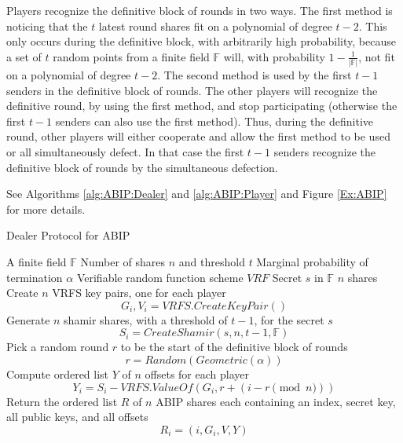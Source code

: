 \documentclass{dalcsthesis}
\begin{document}
Players recognize the definitive block of rounds in two ways. The first method is noticing that the $t$ latest round shares fit on a polynomial of degree $t-2$. This only occurs during the definitive block, with arbitrarily high probability, because a set of $t$ random points from a finite field $\mathbb{F}$ will, with probability $1 - \frac{1}{|\mathbb{F}|}$, not fit on a polynomial of degree $t-2$. The second method is used by the first $t-1$ senders in the definitive block of rounds. The other players will recognize the definitive round, by using the first method, and stop participating (otherwise the first $t-1$ senders can also use the first method). Thus, during the definitive round, other players will either cooperate and allow the first method to be used or all simultaneously defect. In that case the first $t-1$ senders recognize the definitive block of rounds by the simultaneous defection.

See Algorithms \ref{alg:ABIP:Dealer} and \ref{alg:ABIP:Player} and Figure \ref{Ex:ABIP} for more details.

\begin{algorithm}
  \caption{Dealer Protocol for ABIP}
  \label{alg:ABIP:Dealer}
  \begin{algorithmic}
    \INPUT A finite field $\mathbb{F}$
    \INPUT Number of shares $n$ and threshold $t$
    \INPUT Marginal probability of termination $\alpha$
    \INPUT Verifiable random function scheme $VRF$
    \INPUT Secret $s$ in $\mathbb{F}$
    \OUTPUT $n$ shares
    \STATE Create $n$ VRFS key pairs, one for each player
    	$$G_i, V_i = VRFS.CreateKeyPair()$$
    \STATE Generate $n$ shamir shares, with a threshold of $t-1$, for the secret $s$
    	$$S_i = CreateShamir(s, n, t - 1, \mathbb{F})$$
    \STATE Pick a random round $r$ to be the start of the definitive block of rounds
        $$r = Random(Geometric(\alpha))$$
    \STATE Compute ordered list $Y$ of $n$ offsets for each player
    	$$Y_i = S_i - VRFS.ValueOf(G_i, r+(i - r \pmod{n}))$$
    \STATE Return the ordered list $R$ of $n$ ABIP shares each containing an index, secret key, all public keys, and all offsets 
    	$$R_i = (i, G_i, V, Y)$$
  \end{algorithmic}
\end{algorithm}
\end{document}
